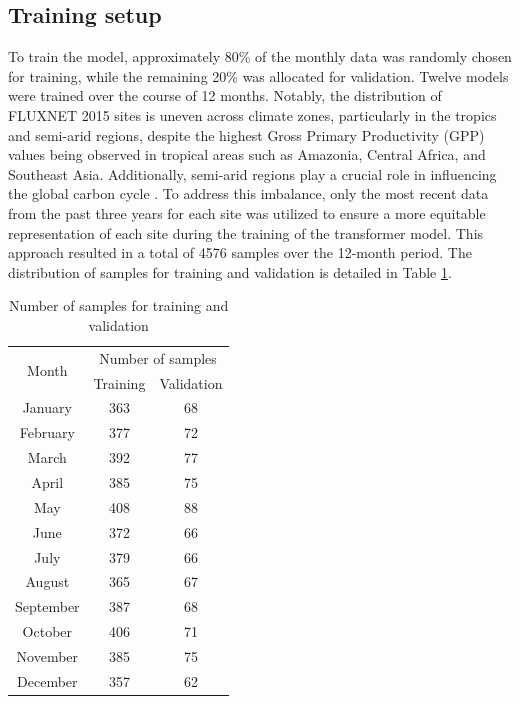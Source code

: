 \subsection{Training setup}
To train the model, approximately 80\% of the monthly data was randomly chosen for training, while the remaining 20\% was allocated for validation. Twelve models were trained over the course of 12 months. Notably, the distribution of FLUXNET 2015 sites is uneven across climate zones, particularly in the tropics and semi-arid regions, despite the highest Gross Primary Productivity (GPP) values being observed in tropical areas such as Amazonia, Central Africa, and Southeast Asia\citep{chen2017regional}. Additionally, semi-arid regions play a crucial role in influencing the global carbon cycle \citep{poulter2014contribution}. To address this imbalance, only the most recent data from the past three years for each site was utilized to ensure a more equitable representation of each site during the training of the transformer model. This approach resulted in a total of 4576 samples over the 12-month period. The distribution of samples for training and validation is detailed in Table \ref{tab:chap6_nosamples}. \par
\begin{table}[!ht]
    \centering
    \caption{Number of samples for training and validation}
    \begin{tabular}{ccc}
        \hline
        \multirow{2}{*}{Month} & \multicolumn{2}{c}{Number of samples} \\ \cline{2-3}
        ~ & Training & Validation \\ \hline
        January & 363 & 68 \\ 
        February & 377 & 72 \\ 
        March & 392 & 77 \\ 
        April & 385 & 75 \\ 
        May & 408 & 88 \\ 
        June & 372 & 66 \\ 
        July & 379 & 66 \\ 
        August & 365 & 67 \\ 
        September & 387 & 68 \\ 
        October & 406 & 71 \\ 
        November & 385 & 75 \\ 
        December & 357 & 62 \\ \hline
    \end{tabular}
    \label{tab:chap6_nosamples}
\end{table}
